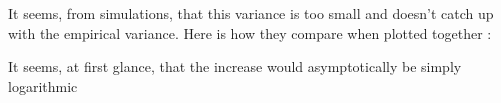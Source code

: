 	\noindent
	It seems, from simulations, that this variance is too small and doesn't
	catch up with the empirical variance. Here is how they compare when plotted
	together :
	
	
	\pagebreak
	\noindent
	It seems, at first glance, that the increase would asymptotically be 
	simply logarithmic
	
	
	\noindent 
	
	
					  
	
	
	
 
 
 

	 	
